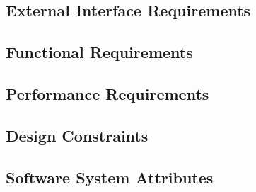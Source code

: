 \subsection{External Interface Requirements}
\label{sect:requirements:extintrequirements}


\subsection{Functional Requirements}
\label{sect:requirements:functrequirements}


\subsection{Performance Requirements}
\label{sect:requirements:perfrequirements}


\subsection{Design Constraints}
\label{sect:requirements:desconstraints}


\subsection{Software System Attributes}
\label{sect:requirements:softwareattributes}
